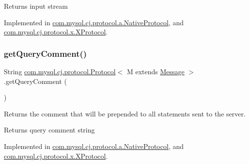 \begin{DoxyReturn}{Returns}
input stream 
\end{DoxyReturn}


Implemented in \mbox{\hyperlink{classcom_1_1mysql_1_1cj_1_1protocol_1_1a_1_1_native_protocol_a27e42d277d58cc8bc89f098b9ac90691}{com.\+mysql.\+cj.\+protocol.\+a.\+Native\+Protocol}}, and \mbox{\hyperlink{classcom_1_1mysql_1_1cj_1_1protocol_1_1x_1_1_x_protocol_a5a291c17d84fa71984b3a65ecbb91315}{com.\+mysql.\+cj.\+protocol.\+x.\+X\+Protocol}}.

\mbox{\label{interfacecom_1_1mysql_1_1cj_1_1protocol_1_1_protocol_a8a25c27a012f47ca25de357e65829884}} 
\subsubsection{\texorpdfstring{get\+Query\+Comment()}{getQueryComment()}}
{\footnotesize\ttfamily String \mbox{\hyperlink{interfacecom_1_1mysql_1_1cj_1_1protocol_1_1_protocol}{com.\+mysql.\+cj.\+protocol.\+Protocol}}$<$ M extends \mbox{\hyperlink{interfacecom_1_1mysql_1_1cj_1_1protocol_1_1_message}{Message}} $>$.get\+Query\+Comment (\begin{DoxyParamCaption}{ }\end{DoxyParamCaption})}

Returns the comment that will be prepended to all statements sent to the server.

\begin{DoxyReturn}{Returns}
query comment string 
\end{DoxyReturn}


Implemented in \mbox{\hyperlink{classcom_1_1mysql_1_1cj_1_1protocol_1_1a_1_1_native_protocol_a49cbec750255abc9a23f447effd70d1d}{com.\+mysql.\+cj.\+protocol.\+a.\+Native\+Protocol}}, and \mbox{\hyperlink{classcom_1_1mysql_1_1cj_1_1protocol_1_1x_1_1_x_protocol_aa6abdec32fdb1e18c44c33b831b40e20}{com.\+mysql.\+cj.\+protocol.\+x.\+X\+Protocol}}.

\mbox{\label{interfacecom_1_1mysql_1_1cj_1_1protocol_1_1_protocol_a5475394532c7c3ff809b46ee47715bdb}} 
